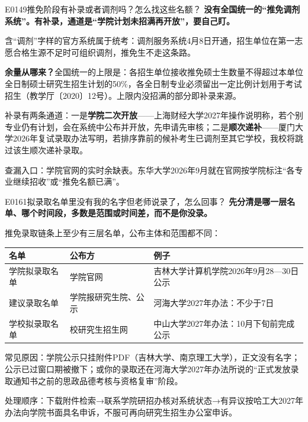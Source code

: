 \begin{qa}{E0149}{推免阶段有补录或者调剂吗？怎么找这些名额？}
\textbf{没有全国统一的“推免调剂系统”。有补录，通道是“学院计划未招满再开放”，要自己盯。}

含“调剂”字样的官方系统属于统考：调剂服务系统4月8日开通，招生单位在第一志愿合格生源不足时可组织调剂，推免生不走这条路。

\textbf{余量从哪来？}全国统一的上限是：各招生单位接收推免硕士生数量不得超过本单位全日制硕士研究生招生计划的50\%，各全日制专业必须留出一定比例计划用于考试招生（教学厅〔2020〕12号）。上限内没招满的部分即补录来源。

补录有两条通道：一是\textbf{学院二次开放}——上海财经大学2027年操作说明称，若个别专业仍有计划，会在系统中公布并开放，先申请先审核；二是\textbf{顺次递补}——厦门大学2026年复试录取办法写明，若排序靠前的候补考生已调剂至其它学校，我校将跳过该生顺次递补录取。

查漏入口：学院官网的实时余缺表。东华大学2026年9月就在官网按学院标注“各专业继续招收”或“推免名额已满”。
\end{qa}

\begin{qa}{E0161}{拟录取名单里没有我的名字但老师说录了，怎么回事？}
\textbf{先分清是哪一层名单、哪个时间段，多数是范围或时间差，而不是你没录。}

推免录取链条上至少有三层名单，公布主体和范围都不同：

\par\vspace{2pt}\nobreak\begin{center}\footnotesize
\begin{tabularx}{\textwidth}{>{\raggedright\arraybackslash}X>{\raggedright\arraybackslash}X>{\raggedright\arraybackslash}X}
\toprule
\textbf{名单} & \textbf{公布方} & \textbf{例子} \\ \midrule
学院拟录取名单 & 学院官网 & 吉林大学计算机学院2026年9月28—30日公示 \\
建议录取名单 & 学院报研究生院、公示 & 河海大学2027年办法：不少于7日 \\
学校拟录取名单 & 校研究生招生网 & 中山大学2027年办法：10月下旬前完成公示 \\
\bottomrule
\end{tabularx}
\end{center}\vspace{2pt}\par

常见原因：学院公示只挂附件PDF（吉林大学、南京理工大学），正文没有名字；公示已过窗口期被撤下；或你的录取还在河海大学2027年办法所说的“正式发放录取通知书之前的思政品德考核与资格复审”阶段。

处理顺序：下载附件检索→联系学院研招办核对系统状态→有异议按哈工大2027年办法向学院书面具名申诉，不服可再向研究生招生办公室申诉。
\end{qa}

